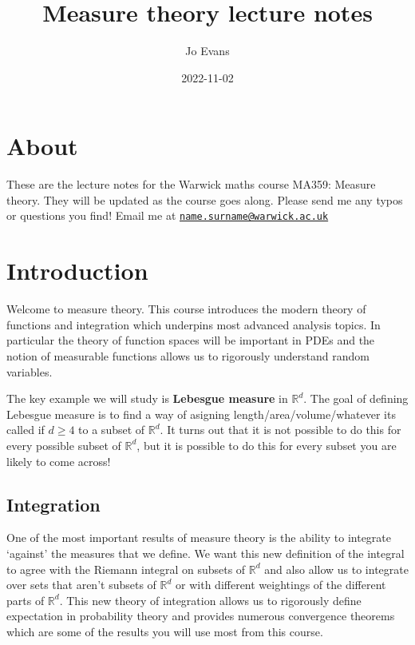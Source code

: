 \documentclass[
]{book}
\title{Measure theory lecture notes}
\author{Jo Evans}
\date{2022-11-02}
\theoremstyle{definition}
\theoremstyle{definition}
\theoremstyle{definition}
\theoremstyle{definition}
\theoremstyle{remark}
\begin{document}
\maketitle

{
\setcounter{tocdepth}{1}
\tableofcontents
}
\hypertarget{about}{%
\chapter*{About}\label{about}}

These are the lecture notes for the Warwick maths course MA359: Measure theory. They will be updated as the course goes along. Please send me any typos or questions you find! Email me at \href{mailto:name.surname@warwick.ac.uk}{\nolinkurl{name.surname@warwick.ac.uk}}

\hypertarget{introduction}{%
\chapter{Introduction}\label{introduction}}

Welcome to measure theory. This course introduces the modern theory of functions and integration which underpins most advanced analysis topics. In particular the theory of function spaces will be important in PDEs and the notion of measurable functions allows us to rigorously understand random variables.

The key example we will study is \textbf{Lebesgue measure} in \(\mathbb{R}^d\). The goal of defining Lebesgue measure is to find a way of asigning length/area/volume/whatever its called if \(d \geq 4\) to a subset of \(\mathbb{R}^d\). It turns out that it is not possible to do this for every possible subset of \(\mathbb{R}^d\), but it is possible to do this for every subset you are likely to come across!

\hypertarget{integration}{%
\section{Integration}\label{integration}}

One of the most important results of measure theory is the ability to integrate `against' the measures that we define. We want this new definition of the integral to agree with the Riemann integral on subsets of \(\mathbb{R}^d\) and also allow us to integrate over sets that aren't subsets of \(\mathbb{R}^d\) or with different weightings of the different parts of \(\mathbb{R}^d\). This new theory of integration allows us to rigorously define expectation in probability theory and provides numerous convergence theorems which are some of the results you will use most from this course.
\end{document}
